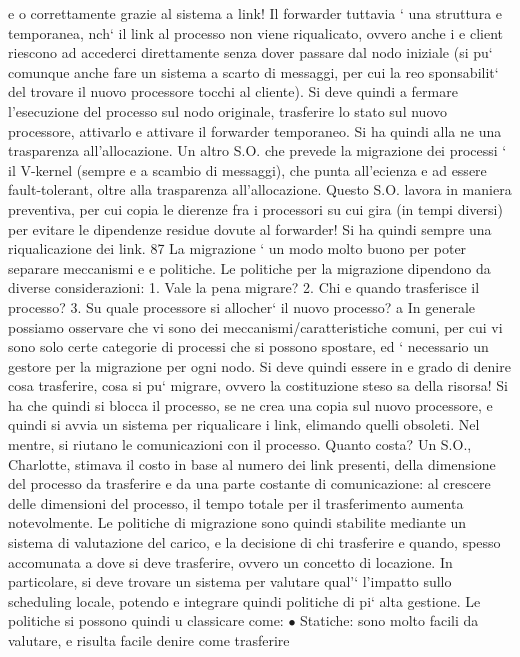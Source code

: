 \documentclass[a4paper,12pt]{article}
\begin{document}
e
o
correttamente grazie al sistema a link! Il forwarder tuttavia ` una struttura
e
temporanea, nch` il link al processo non viene riqualicato, ovvero anche i
e
client riescono ad accederci direttamente senza dover passare dal nodo iniziale
(si pu` comunque anche fare un sistema a scarto di messaggi, per cui la reo
sponsabilit` del trovare il nuovo processore tocchi al cliente). Si deve quindi
a
fermare l'esecuzione del processo sul nodo originale, trasferire lo stato sul nuovo
processore, attivarlo e attivare il forwarder temporaneo. Si ha quindi alla ne
una trasparenza all'allocazione.
Un altro S.O. che prevede la migrazione dei processi ` il V-kernel (sempre
e
a scambio di messaggi), che punta all'ecienza e ad essere fault-tolerant, oltre
alla trasparenza all'allocazione. Questo S.O. lavora in maniera preventiva, per
cui copia le dierenze fra i processori su cui gira (in tempi diversi) per evitare
le dipendenze residue dovute al forwarder! Si ha quindi sempre una riqualicazione dei link.
87
La migrazione ` un modo molto buono per poter separare meccanismi e
e
politiche. Le politiche per la migrazione dipendono da diverse considerazioni:
1. Vale la pena migrare?
2. Chi e quando trasferisce il processo?
3. Su quale processore si allocher` il nuovo processo?
a
In generale possiamo osservare che vi sono dei meccanismi/caratteristiche comuni, per cui vi sono solo certe categorie
di processi che si possono spostare, ed
` necessario un gestore per la migrazione per ogni nodo. Si deve quindi essere in
e
grado di denire cosa trasferire, cosa si pu` migrare, ovvero la costituzione steso
sa della risorsa! Si ha che quindi si blocca il processo, se ne crea una copia sul
nuovo processore, e quindi si avvia un sistema per riqualicare i link, elimando
quelli obsoleti. Nel mentre, si riutano le comunicazioni con il processo.
Quanto costa? Un S.O., Charlotte, stimava il costo in base al numero dei
link presenti, della dimensione del processo da trasferire e da una parte costante
di comunicazione: al crescere delle dimensioni del processo, il tempo totale per
il trasferimento aumenta notevolmente.
Le politiche di migrazione sono quindi stabilite mediante un sistema di valutazione del carico, e la decisione di chi
trasferire e quando, spesso accomunata
a dove si deve trasferire, ovvero un concetto di locazione. In particolare, si deve
trovare un sistema per valutare qual'` l'impatto sullo scheduling locale, potendo
e
integrare quindi politiche di pi` alta gestione. Le politiche si possono quindi
u
classicare come:
$\bullet$ Statiche: sono molto facili da valutare, e risulta facile denire come trasferire
\end{document}
